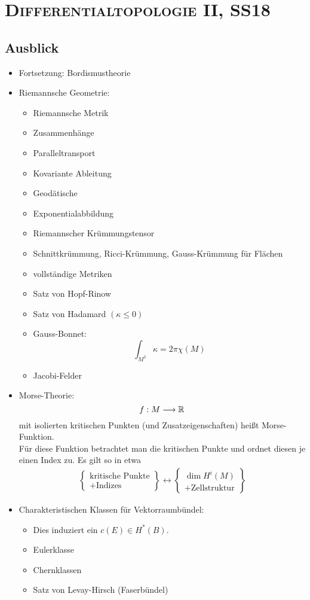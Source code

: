 \chapter*{\textsc{Differentialtopologie II}, SS18}
\section{Ausblick}
\begin{itemize}
	\item Fortsetzung: Bordismustheorie
	\item Riemannsche Geometrie:
	\begin{itemize}
		\item Riemannsche Metrik
		\item Zusammenhänge
		\item Paralleltransport
		\item Kovariante Ableitung
		\item Geodätische
		\item Exponentialabbildung
		\item Riemannscher Krümmungstensor
		\item Schnittkrümmung, Ricci-Krümmung, Gauss-Krümmung für Flächen
		\item vollständige Metriken
		\item Satz von Hopf-Rinow
		\item Satz von Hadamard $(\kappa \leq 0)$
		\item {Gauss-Bonnet}:
		\[ \int_{M^2} \kappa = 2\pi \chi(M) \]
		\item Jacobi-Felder
	\end{itemize}
	\item Morse-Theorie:
	\[ f: M \overset{}{\longrightarrow} \mathbb{R} \]
	mit isolierten kritischen Punkten (und Zusatzeigenschaften) heißt Morse-Funktion.\\
	Für diese Funktion betrachtet man die kritischen Punkte und ordnet diesen je einen Index zu. Es gilt so in etwa
	\begin{align*}
	\left\lbrace
	\begin{aligned}
	\text{kritische Punkte}\\
	+ \text{Indizes}
	\end{aligned}
	\right\rbrace
	\longleftrightarrow
	\left\lbrace
	\begin{aligned}
	\dim H^i(M)\\
	+\text{Zellstruktur}
	\end{aligned}
	\right\rbrace
	\end{align*}
	
	\item Charakteristischen Klassen für Vektorraumbündel:
	\begin{itemize}
		\item {}
		Dies induziert ein $c(E) \in H^*(B)$.
		\item Eulerklasse
		\item Chernklassen
		\item Satz von Levay-Hirsch (Faserbündel)
	\end{itemize}
\end{itemize}